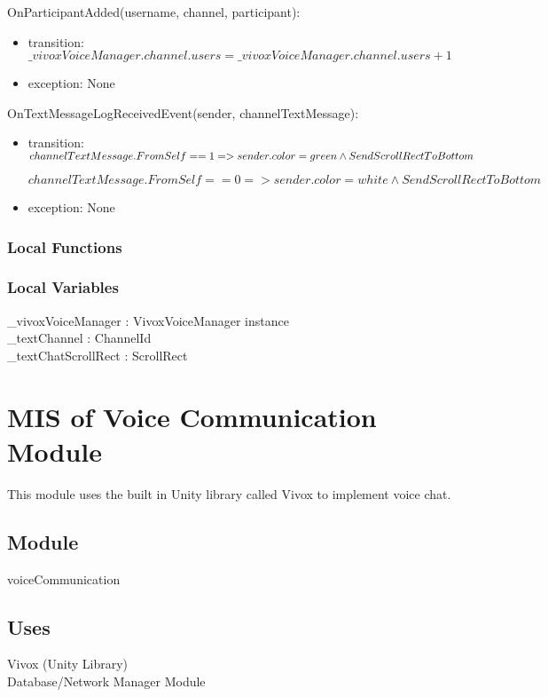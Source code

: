 \documentclass[12pt, titlepage]{article}
\begin{document}
\noindent OnParticipantAdded(username, channel, participant):
\begin{itemize}
\item transition: $\_vivoxVoiceManager.channel.users = \_vivoxVoiceManager.channel.users + 1$
\item exception: None
\end{itemize}

\noindent OnTextMessageLogReceivedEvent(sender, channelTextMessage):
\begin{itemize}
\item transition: $channelTextMessage.FromSelf == 1 => sender.color = green \newline \land SendScrollRectToBottom$

$channelTextMessage.FromSelf == 0 => sender.color = white \land SendScrollRectToBottom$
\item exception: None
\end{itemize}

\subsubsection{Local Functions}


\subsubsection{Local Variables}
\_vivoxVoiceManager : VivoxVoiceManager instance\\
\_textChannel : ChannelId\\
\_textChatScrollRect : ScrollRect\\


\newpage

\section{MIS of Voice Communication Module} \label{text} 
This module uses the built in Unity library called Vivox to implement voice chat.

\subsection{Module}
voiceCommunication

\subsection{Uses}
Vivox (Unity Library)\\
Database/Network Manager Module
\end{document}
